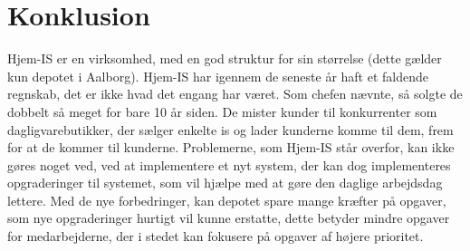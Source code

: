 \section{Konklusion}
Hjem-IS er en virksomhed, med en god struktur for sin størrelse (dette gælder kun depotet i Aalborg). Hjem-IS har igennem de seneste år haft et faldende regnskab, det er ikke hvad det engang har været. Som chefen nævnte, så solgte de dobbelt så meget for bare 10 år siden. De mister kunder til konkurrenter som dagligvarebutikker, der sælger enkelte is og lader kunderne komme til dem, frem for at de kommer til kunderne. Problemerne, som Hjem-IS står overfor, kan ikke gøres noget ved, ved at implementere et nyt system, der kan dog implementeres opgraderinger til systemet, som vil hjælpe med at gøre den daglige arbejdsdag lettere. Med de nye forbedringer, kan depotet spare mange kræfter på opgaver, som nye opgraderinger hurtigt vil kunne erstatte, dette betyder mindre opgaver for medarbejderne, der i stedet kan fokusere på opgaver af højere prioritet. 
%
